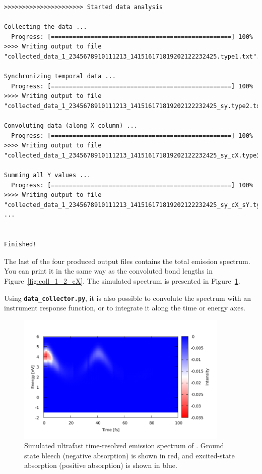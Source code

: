 \documentclass[a4paper,11pt,DIV=15,openany]{scrbook}
\newcommand{\ttt}[1]{\textbf{\texttt{#1}}}
\begin{document}
\begin{oframed}
\begin{Verbatim}[commandchars=\\\{\}]
>>>>>>>>>>>>>>>>>>>>>> Started data analysis

Collecting the data ...
  Progress: [==================================================] 100%
>>>> Writing output to file "collected_data_1_2345678910111213_141516171819202122232425.type1.txt"...

Synchronizing temporal data ...
  Progress: [==================================================] 100%
>>>> Writing output to file "collected_data_1_2345678910111213_141516171819202122232425_sy.type2.txt"...

Convoluting data (along X column) ...
  Progress: [==================================================] 100%
>>>> Writing output to file "collected_data_1_2345678910111213_141516171819202122232425_sy_cX.type3.txt"...

Summing all Y values ...
  Progress: [==================================================] 100%
>>>> Writing output to file "collected_data_1_2345678910111213_141516171819202122232425_sy_cX_sY.type3.txt"
...


Finished!
\end{Verbatim}
\end{oframed}

\normalsize
The last of the four produced output files contains the total emission spectrum.
You can print it in the same way as the convoluted bond lengths in Figure~\ref{fig:coll_1_2_cX}.
The simulated spectrum is presented in Figure~\ref{fig:emission_spec}.

Using \ttt{data\_collector.py}, it is also possible to convolute the spectrum with an instrument response function, or to integrate it along the time or energy axes.

\begin{figure}[h]
  \centering
  \includegraphics[width=0.9\textwidth]{figures/emission_spec.png}
  \caption{Simulated ultrafast time-resolved emission spectrum of . Ground state bleech (negative absorption) is shown in red, and excited-state absorption (positive absorption) is shown in blue.}
  \label{fig:emission_spec}
\end{figure}
\end{document}
